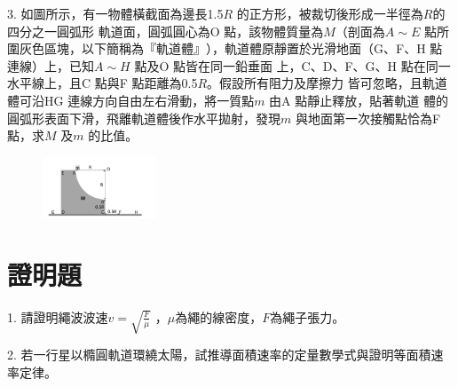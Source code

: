 \documentclass[cn,10pt,math=newtx,chinesefont=founder,device=ig]{elegantbook}
\begin{document}
\begin{example}
   3. 如圖所示，有一物體橫截面為邊長1.5$R$ 的正方形，被裁切後形成一半徑為$R$的四分之一圓弧形
軌道面，圓弧圓心為O 點，該物體質量為$M$（剖面為$A\sim E$ 點所圍灰色區塊，以下簡稱為$『軌道
體』$），軌道體原靜置於光滑地面（G、F、H 點連線）上，已知$A\sim H$ 點及O 點皆在同一鉛垂面
上，C、D、F、G、H 點在同一水平線上，且C 點與F 點距離為0.5$R$。假設所有阻力及摩擦力
皆可忽略，且軌道體可沿HG 連線方向自由左右滑動，將一質點$m$ 由A 點靜止釋放，貼著軌道
體的圓弧形表面下滑，飛離軌道體後作水平拋射，發現$m$ 與地面第一次接觸點恰為F 點，求$M$
及$m$ 的比值。\\
    \rightline{[全國聯招教甄109]}
\end{example}
\begin{solution}
    
\end{solution}
\begin{figure}[htbp]
    \flushright
    \includegraphics[width=0.3\textwidth]{image/109全國33.png}
  \end{figure}
\newpage

\section{證明題}


\begin{example}
   1. 請證明繩波波速$v = \sqrt{\frac{F}{\mu}}$
，$\mu$為繩的線密度，$F$為繩子張力。
\\
    \rightline{[全國聯招教甄109]}
\end{example}
\begin{solution}
    
\end{solution}

\newpage



\begin{example}
   2. 若一行星以橢圓軌道環繞太陽，試推導面積速率的定量數學式與證明等面積速率定律。\\
    \rightline{[全國聯招教甄109]}
\end{example}
\begin{solution}
    
\end{solution}
\end{document}
